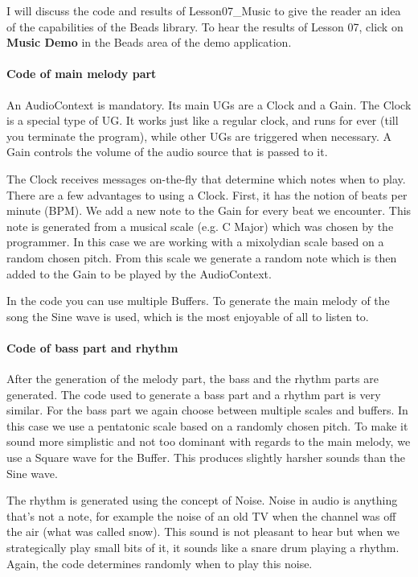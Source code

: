 \documentclass[12pt]{article}
\begin{document}
I will discuss the code and results of Lesson07\_Music to give the reader an idea of the capabilities of the Beads library. To hear the results of Lesson 07, click on \textbf{Music Demo} in the Beads area of the demo application.

\paragraph{Code of main melody part}

An AudioContext is mandatory. Its main UGs are a Clock and a Gain. The Clock is a special type of UG. It works just like a regular clock, and runs for ever (till you terminate the program), while other UGs are triggered when necessary. A Gain controls the volume of the audio source that is passed to it.

The Clock receives messages on-the-fly that determine which notes when to play. There are a few advantages to using a Clock. 
First, it has the notion of beats per minute (BPM). We add a new note to the Gain for every beat we encounter. This note is generated from a musical scale (e.g. C Major) which was chosen by the programmer. In this case we are working with a mixolydian scale based on a random chosen pitch. From this scale we generate a random note which is then added to the Gain to be played by the AudioContext.

In the code you can use multiple Buffers. To generate the main melody of the song the Sine wave is used, which is the most enjoyable of all to listen to.

\paragraph{Code of bass part and rhythm} 

After the generation of the melody part, the bass and the rhythm parts are generated.
The code used to generate a bass part and a rhythm part is very similar. For the bass part we again choose between multiple scales and buffers. In this case we use a pentatonic scale based on a randomly chosen pitch. To make it sound more simplistic and not too dominant with regards to the main melody, we use a Square wave for the Buffer. This produces slightly harsher sounds than the Sine wave.

The rhythm is generated using the concept of Noise. Noise in audio is anything that's not a note, for example the noise of an old TV when the channel was off the air (what was called snow). This sound is not pleasant to hear but when we strategically play small bits of it, it sounds like a snare drum playing a rhythm. Again, the code determines randomly when to play this noise. 
\end{document}
